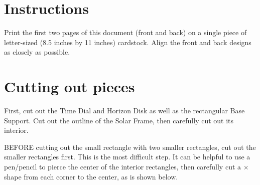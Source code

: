 \documentclass[tikz]{article}
\newif\ifPrintInstructions  %
\newcommand*{\OutlineWidth}{2pt}
\newcommand*{\SunCarriageWidth}{1.8cm}
\newcommand*{\SunCarriageHeight}{\SunCarriageWidth}
\newcommand*{\SunCarriageInternalWidth}{0.4cm}
\begin{document}
\ifPrintInstructions
	\newpage
	\begin{multicols}{2}
	\section*{Instructions}
	Print the first two pages of this document (front and back) on a single piece of letter-sized (8.5 inches by 11 inches) cardstock. Align the front and back designs as closely as possible. 
	
	\section{Cutting out pieces}
	First, cut out the Time Dial and Horizon Disk as well as the rectangular Base Support. Cut out the outline of the Solar Frame, then carefully cut out its interior. 
	
	BEFORE cutting out the small rectangle with two smaller rectangles, cut out the smaller rectangles first. This is the most difficult step. It can be helpful to use a pen/pencil to pierce the center of the interior rectangles, then carefully cut a $\times$ shape from each corner to the center, as is shown below.
	\begin{center}
\end{center}
\end{multicols}
\end{document}
